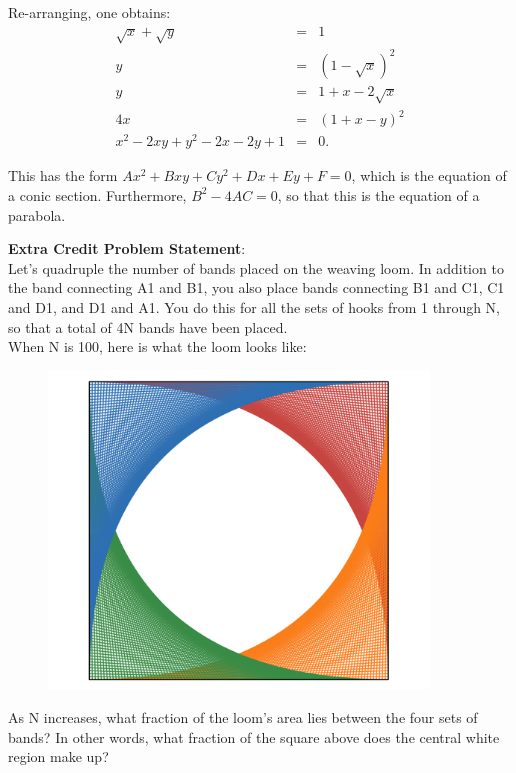 \documentclass[10pt,a4paper]{article}
\begin{document}
Re-arranging, one obtains:
\begin{eqnarray*}
\sqrt{x} + \sqrt{y} & = & 1\\
y & = & (1-\sqrt{x})^2\\
y & = & 1 + x - 2\sqrt{x}\\
4x & = & (1 + x - y)^2\\
x^2 - 2xy + y^2 - 2x - 2y + 1 & = & 0.
\end{eqnarray*}

This has the form $Ax^2 + Bxy + Cy^2 + Dx + Ey + F = 0$, which is the equation of a conic section. Furthermore, $B^2 - 4AC = 0 $, so that this is the equation of a parabola.

\pagebreak

\textbf{Extra Credit Problem Statement}:\\
Let’s quadruple the number of bands placed on the weaving loom. In addition to the band connecting A1 and B1, you also place bands connecting B1 and C1, C1 and D1, and D1 and A1. You do this for all the sets of hooks from 1 through N, so that a total of 4N bands have been placed.\\

When N is 100, here is what the loom looks like:\\
\begin{figure}[h!]
\centering
\includegraphics[width=0.9\textwidth]{Loom2}
\end{figure}

As N increases, what fraction of the loom’s area lies between the four sets of bands? In other words, what fraction of the square above does the central white region make up?\\
\end{document}
